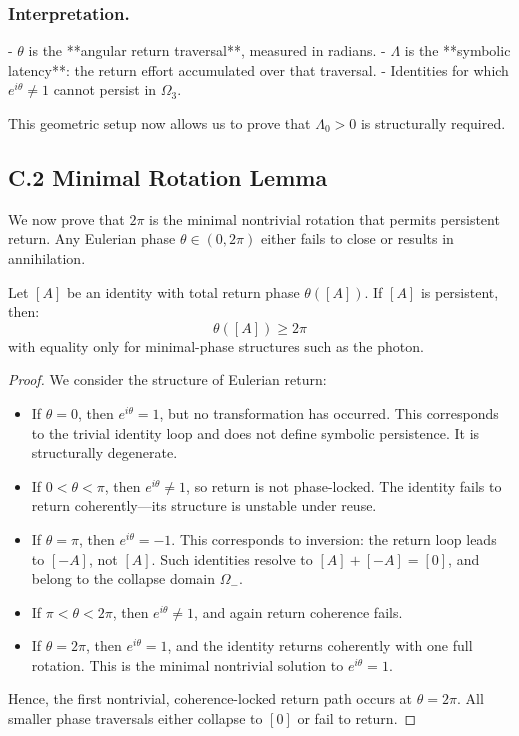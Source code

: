\subsubsection*{Interpretation.}
- $\theta$ is the **angular return traversal**, measured in radians.
- $\Lambda$ is the **symbolic latency**: the return effort accumulated over that traversal.
- Identities for which $e^{i \theta} \ne 1$ cannot persist in $\Omega_3$.

This geometric setup now allows us to prove that $\Lambda_0 > 0$ is structurally required.

\subsection*{C.2 \quad Minimal Rotation Lemma}
\label{sec:c2-minimal-rotation}

We now prove that $2\pi$ is the minimal nontrivial rotation that permits persistent return. Any Eulerian phase $\theta \in (0, 2\pi)$ either fails to close or results in annihilation.

\begin{lemma}
Let $[A]$ be an identity with total return phase $\theta([A])$. If $[A]$ is persistent, then:
\[
\theta([A]) \geq 2\pi
\]
with equality only for minimal-phase structures such as the photon.
\end{lemma}

\begin{proof}
We consider the structure of Eulerian return:

\begin{itemize}
    \item If $\theta = 0$, then $e^{i\theta} = 1$, but no transformation has occurred. This corresponds to the trivial identity loop and does not define symbolic persistence. It is structurally degenerate.

    \item If $0 < \theta < \pi$, then $e^{i\theta} \ne 1$, so return is not phase-locked. The identity fails to return coherently—its structure is unstable under reuse.

    \item If $\theta = \pi$, then $e^{i\theta} = -1$. This corresponds to inversion: the return loop leads to $[-A]$, not $[A]$. Such identities resolve to $[A] + [-A] = [0]$, and belong to the collapse domain $\Omega_-$.

    \item If $\pi < \theta < 2\pi$, then $e^{i\theta} \ne 1$, and again return coherence fails.

    \item If $\theta = 2\pi$, then $e^{i\theta} = 1$, and the identity returns coherently with one full rotation. This is the minimal nontrivial solution to $e^{i\theta} = 1$.
\end{itemize}

Hence, the first nontrivial, coherence-locked return path occurs at $\theta = 2\pi$. All smaller phase traversals either collapse to $[0]$ or fail to return.

\end{proof}

